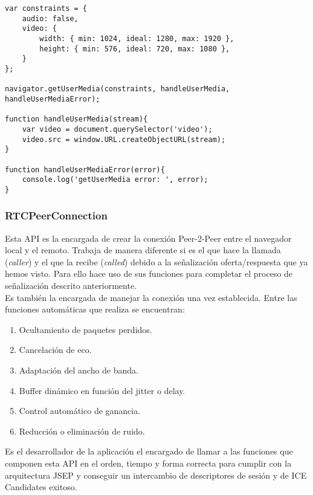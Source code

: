 \begin{lstlisting}[caption=Llamada a función RTCPeerConnection]
var constraints = {
    audio: false,
    video: {
        width: { min: 1024, ideal: 1280, max: 1920 },
        height: { min: 576, ideal: 720, max: 1080 },
    }
};

navigator.getUserMedia(constraints, handleUserMedia, handleUserMediaError); 

function handleUserMedia(stream){
    var video = document.querySelector('video');
    video.src = window.URL.createObjectURL(stream);
}

function handleUserMediaError(error){
	console.log('getUserMedia error: ', error);
}

\end{lstlisting}

\subsubsection{RTCPeerConnection}

Esta API es la encargada de crear la conexión Peer-2-Peer entre el navegador local y el remoto. Trabaja de manera diferente si es el que hace la llamada (\textit{caller}) y el que la recibe (\textit{called}) debido a la señalización oferta/respuesta que ya hemos visto. Para ello hace uso de sus funciones para completar el proceso de señalización descrito anteriormente.\\

\noindent Es también la encargada de manejar la conexión una vez establecida. Entre las funciones automáticas que realiza se encuentran:\\

\begin{enumerate}
\item Ocultamiento de paquetes perdidos.
\item Cancelación de eco.
\item Adaptación del ancho de banda.
\item Buffer dinámico en función del jitter o delay.
\item Control automático de ganancia.
\item Reducción o eliminación de ruido.
\end{enumerate}

Es el desarrollador de la aplicación el encargado de llamar a las funciones que componen esta API en el orden, tiempo y forma correcta para cumplir con la arquitectura JSEP y conseguir un intercambio de descriptores de sesión y de ICE Candidates exitoso.\\

